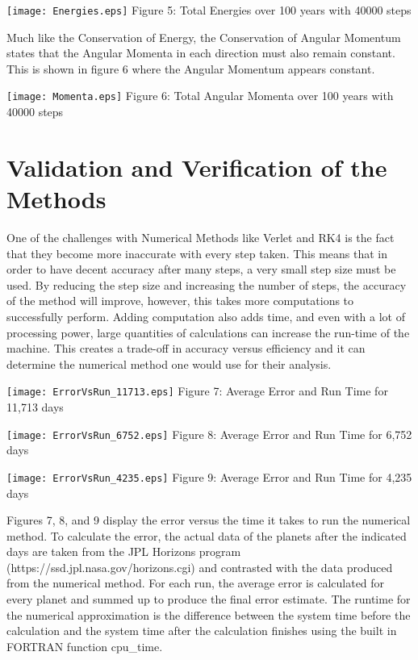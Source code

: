 \documentclass{article}
\begin{document}
\begin{multicols}{2}
\begin{center}
\texttt{[image: Energies.eps]}
\scriptsize{
Figure 5: Total Energies over 100 years with 40000 steps
}
\end{center}

Much like the Conservation of Energy, the Conservation of Angular Momentum states that the Angular Momenta in each direction must also remain constant. This is shown in figure 6 where the Angular Momentum appears constant.

\begin{center}
\texttt{[image: Momenta.eps]}
\scriptsize{
Figure 6: Total Angular Momenta over 100 years with 40000 steps
}
\end{center}


\section{Validation and Verification of the Methods}
One of the challenges with Numerical Methods like Verlet and RK4 is the fact that they become more inaccurate with every step taken. This means that in order to have decent accuracy after many steps, a very small step size must be used. By reducing the step size and increasing the number of steps, the accuracy of the method will improve, however, this takes more computations to successfully perform. Adding computation also adds time, and even with a lot of processing power, large quantities of calculations can increase the run-time of the machine. This creates a trade-off in accuracy versus efficiency and it can determine the numerical method one would use for their analysis.

\begin{center}
\texttt{[image: ErrorVsRun\_11713.eps]}
\scriptsize{
Figure 7: Average Error and Run Time for 11,713 days
}
\end{center}

\begin{center}
\texttt{[image: ErrorVsRun\_6752.eps]}
\scriptsize{
Figure 8: Average Error and Run Time for 6,752 days
}
\end{center}

\begin{center}
\texttt{[image: ErrorVsRun\_4235.eps]}
\scriptsize{
Figure 9: Average Error and Run Time for 4,235 days
}
\end{center}

Figures 7, 8, and 9 display the error versus the time it takes to run the numerical method. To calculate the error, the actual data of the planets after the indicated days are taken from the JPL Horizons program (https://ssd.jpl.nasa.gov/horizons.cgi) and contrasted with the data produced from the numerical method. For each run, the average error is calculated for every planet and summed up to produce the final error estimate. The runtime for the numerical approximation is the difference between the system time before the calculation and the system time after the calculation finishes using the built in FORTRAN function cpu\_time.


\end{multicols}
\end{document}
